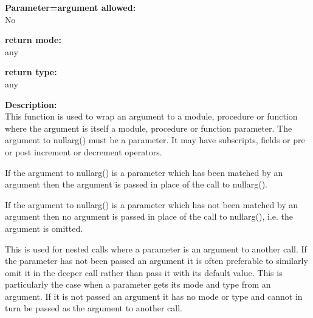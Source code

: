         {\bf Parameter=argument allowed:} \\
        No
        
        {\bf return mode:} \\
        any

        {\bf return type:} \\
        any
        
        {\bf Description:} \\
        This function is used to wrap an argument to a module, procedure or function
        where the argument is itself a module, procedure or function parameter.
        The argument to nullarg() must be a parameter. It may have subscripts,
        fields or pre or post increment or decrement operators.

        If the argument to nullarg() is a parameter which has been matched by an
        argument then the argument is passed in place of the call to nullarg().
        
        If the argument to nullarg() is a parameter which has not been matched by
        an argument then no argument is passed in place of the call to nullarg(),
        i.e. the argument is omitted.
        
        This is used for nested calls where a parameter is an
        argument to another call. If the parameter has not been passed an
        argument it is often preferable to similarly omit it in the deeper
        call rather than pass it with its default value. This is particularly
        the case when a parameter gets its mode and type from an argument. If
        it is not passed an argument it has no mode or type and cannot in
        turn be passed as the argument to another call.


%        
%        
%        
%        
%
%        


